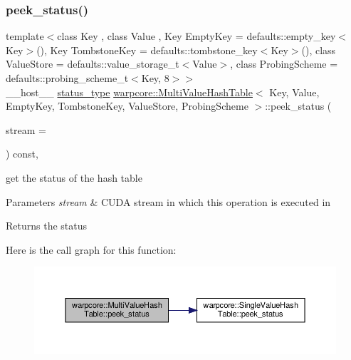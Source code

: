 \subsubsection{\texorpdfstring{peek\+\_\+status()}{peek\_status()}}
{\footnotesize\ttfamily template$<$class Key , class Value , Key Empty\+Key = defaults\+::empty\+\_\+key$<$\+Key$>$(), Key Tombstone\+Key = defaults\+::tombstone\+\_\+key$<$\+Key$>$(), class Value\+Store  = defaults\+::value\+\_\+storage\+\_\+t$<$\+Value$>$, class Probing\+Scheme  = defaults\+::probing\+\_\+scheme\+\_\+t$<$\+Key, 8$>$$>$ \\
\+\_\+\+\_\+host\+\_\+\+\_\+ \hyperlink{classwarpcore_1_1Status}{status\+\_\+type} \hyperlink{classwarpcore_1_1MultiValueHashTable}{warpcore\+::\+Multi\+Value\+Hash\+Table}$<$ Key, Value, Empty\+Key, Tombstone\+Key, Value\+Store, Probing\+Scheme $>$\+::peek\+\_\+status (\begin{DoxyParamCaption}\item[{cuda\+Stream\+\_\+t}]{stream = {} }\end{DoxyParamCaption}) const\hspace{0.3cm}{\ttfamily [inline]}, {\ttfamily [noexcept]}}



get the status of the hash table 


\begin{DoxyParams}{Parameters}
{\em stream} & C\+U\+DA stream in which this operation is executed in \\
\hline
\end{DoxyParams}
\begin{DoxyReturn}{Returns}
the status 
\end{DoxyReturn}
Here is the call graph for this function\+:
\nopagebreak
\begin{figure}[H]
\begin{center}
\leavevmode
\includegraphics[width=350pt]{classwarpcore_1_1MultiValueHashTable_a3e494c09904b4ea2c68c623641a391f3_cgraph}
\end{center}
\end{figure}
\mbox{\label{classwarpcore_1_1MultiValueHashTable_af944a4ab507f431152657930db9cae99}} 
